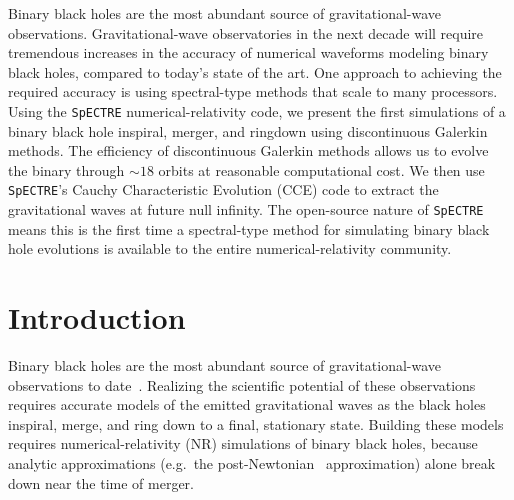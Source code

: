 \begin{bibunit}[unsrtnat]

\noindent Binary black holes are the most abundant source of gravitational-wave
observations. Gravitational-wave observatories in the next decade will require
tremendous increases in the accuracy of numerical waveforms modeling binary
black holes, compared to today's state of the art. One approach to achieving
the required accuracy is using spectral-type methods that scale to many
processors. Using the
\texttt{SpECTRE} numerical-relativity code, we present the first simulations
of a binary black hole inspiral, merger, and ringdown using discontinuous
Galerkin methods. The efficiency of discontinuous Galerkin methods allows us
to evolve the binary through $\sim18$ orbits at reasonable computational cost.
We then use \texttt{SpECTRE}'s Cauchy Characteristic Evolution (CCE) code to
extract the gravitational waves at future null infinity.  The open-source
nature of \texttt{SpECTRE} means this is the first time a spectral-type method
for simulating binary black hole evolutions is available to the entire
numerical-relativity community.



\newpage

\section{Introduction\label{sec:introduction}}

Binary black holes are the most abundant source of gravitational-wave
observations to date~\cite{KAGRA:2021vkt}. Realizing the scientific potential of
these observations requires accurate models of the emitted gravitational waves
as the black holes inspiral, merge, and ring down to a final, stationary
state. Building these models requires numerical-relativity (NR) simulations of binary
black holes, because analytic approximations (e.g.~the
post-Newtonian~\cite{Blanchet:2024mnz} approximation) alone break down near the
time of merger.


\end{bibunit}
